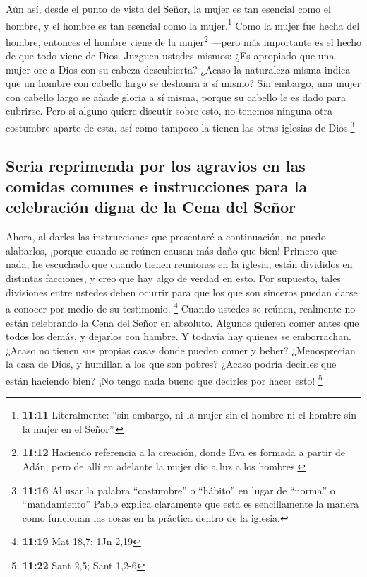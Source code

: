  Aún así, desde el punto de vista del Señor, la mujer es
tan esencial como el hombre, y el hombre es tan esencial como la
mujer.\footnote{\textbf{11:11} Literalmente: ``sin embargo, ni la mujer
  sin el hombre ni el hombre sin la mujer en el Señor''.}
 Como la mujer fue hecha del hombre, entonces el hombre
viene de la mujer\footnote{\textbf{11:12} Haciendo referencia a la
  creación, donde Eva es formada a partir de Adán, pero de allí en
  adelante la mujer dio a luz a los hombres.} ---pero más importante es
el hecho de que todo viene de Dios.  Juzguen ustedes
mismos: ¿Es apropiado que una mujer ore a Dios con su cabeza
descubierta?  ¿Acaso la naturaleza misma indica que un
hombre con cabello largo se deshonra a sí mismo?  Sin
embargo, una mujer con cabello largo se añade gloria a sí misma, porque
su cabello le es dado para cubrirse.  Pero si alguno
quiere discutir sobre esto, no tenemos ninguna otra costumbre aparte de
esta, así como tampoco la tienen las otras iglesias de Dios.\footnote{\textbf{11:16}
  Al usar la palabra ``costumbre'' o ``hábito'' en lugar de ``norma'' o
  ``mandamiento'' Pablo explica claramente que esta es sencillamente la
  manera como funcionan las cosas en la práctica dentro de la iglesia.}

\hypertarget{seria-reprimenda-por-los-agravios-en-las-comidas-comunes-e-instrucciones-para-la-celebraciuxf3n-digna-de-la-cena-del-seuxf1or}{%
\subsection{Seria reprimenda por los agravios en las comidas comunes e
instrucciones para la celebración digna de la Cena del
Señor}\label{seria-reprimenda-por-los-agravios-en-las-comidas-comunes-e-instrucciones-para-la-celebraciuxf3n-digna-de-la-cena-del-seuxf1or}}

 Ahora, al darles las instrucciones que presentaré a
continuación, no puedo alabarlos, ¡porque cuando se reúnen causan más
daño que bien!  Primero que nada, he escuchado que cuando
tienen reuniones en la iglesia, están divididos en distintas facciones,
y creo que hay algo de verdad en esto.  Por supuesto,
tales divisiones entre ustedes deben ocurrir para que los que son
sinceros puedan darse a conocer por medio de su testimonio. \footnote{\textbf{11:19}
  Mat 18,7; 1Jn 2,19}  Cuando ustedes se reúnen,
realmente no están celebrando la Cena del Señor en absoluto.
 Algunos quieren comer antes que todos los demás, y
dejarlos con hambre. Y todavía hay quienes se emborrachan.
 ¿Acaso no tienen sus propias casas donde pueden comer y
beber? ¿Menosprecian la casa de Dios, y humillan a los que son pobres?
¿Acaso podría decirles que están haciendo bien? ¡No tengo nada bueno que
decirles por hacer esto! \footnote{\textbf{11:22} Sant 2,5; Sant 1,2-6}

